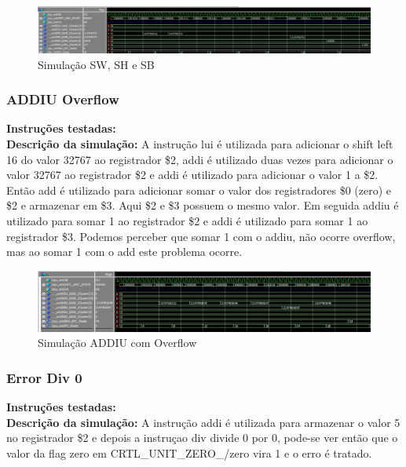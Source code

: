 \begin{figure}[htbp!]
\centering
\includegraphics[width=1\textwidth]{figure/simulacao_sw_sh_sb.png}
\caption{Simulação SW, SH e SB} 
\label{fig:imagem_massa}
\end{figure}

\subsubsection{ADDIU Overflow}
\textbf{Instruções testadas:}
 \\

\textbf{Descrição da simulação:} A instrução lui é utilizada para adicionar o shift left 16 do valor 32767 ao registrador \$2, addi é utilizado duas vezes para adicionar o valor 32767 ao registrador \$2 e addi é utilizado para adicionar o valor 1 a \$2. Então add é utilizado para adicionar somar o valor dos registradores \$0 (zero) e \$2 e armazenar em \$3. Aqui \$2 e \$3 possuem o mesmo valor. Em seguida addiu é utilizado para somar 1 ao registrador \$2 e addi é utilizado para somar 1 ao registrador \$3. Podemos perceber que somar 1 com o addiu, não ocorre overflow, mas ao somar 1 com o add este problema ocorre. \\

\begin{figure}[htbp!]
\centering
\includegraphics[width=1\textwidth]{figure/simulacao_addiu_com_overflow.png}
\caption{Simulação ADDIU com Overflow} 
\label{fig:imagem_massa}
\end{figure}

\subsubsection{Error Div 0}
\textbf{Instruções testadas:}
 \\

\textbf{Descrição da simulação:} A instrução addi é utilizada para armazenar o valor 5 no registrador \$2 e depois a instruçao div divide 0 por 0, pode-se ver então que o valor da flag zero em CRTL\_UNIT\_ZERO\_/zero vira 1 e o erro é tratado.\\

